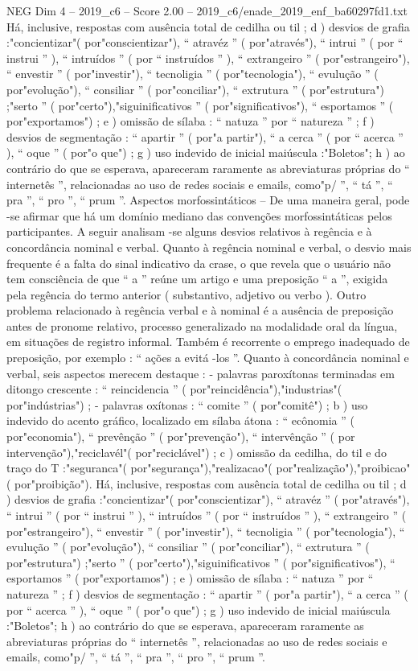 \begin{textsample}{NEG Dim 4 – 2019\_c6 – Score 2.00 – 2019\_c6/enade\_2019\_enf\_ba60297fd1.txt}
Há, inclusive, respostas com ausência total de cedilha ou til ; d ) desvios de grafia :"concientizar"( por"conscientizar"), “ atravéz ” ( por"através"), “ intrui ” ( por “ instrui ” ), “ intruídos ” ( por “ instruídos ” ), “ extrangeiro ” ( por"estrangeiro"), “ envestir ” ( por"investir"), “ tecnoligia ” ( por"tecnologia"), “ evulução ” ( por"evolução"), “ consiliar ” ( por"conciliar"), “ extrutura ” ( por"estrutura") ;"serto ” ( por"certo"),"siguinificativos ” ( por"significativos"), “ esportamos ” ( por"exportamos") ; e ) omissão de sílaba : “ natuza ” por “ natureza ” ; f ) desvios de segmentação : “ apartir ” ( por"a partir"), “ a cerca ” ( por “ acerca ” ), “ oque ” ( por"o que") ; g ) uso indevido de inicial maiúscula :"Boletos"; h ) ao contrário do que se esperava, apareceram raramente as abreviaturas próprias do “ internetês ”, relacionadas ao uso de redes sociais e emails, como"p/ ”, “ tá ”, “ pra ”, “ pro ”, “ prum ”.
Aspectos morfossintáticos – De uma maneira geral, pode -se afirmar que há um domínio mediano das convenções morfossintáticas pelos participantes.
A seguir analisam -se alguns desvios relativos à regência e à concordância nominal e verbal.
Quanto à regência nominal e verbal, o desvio mais frequente é a falta do sinal indicativo da crase, o que revela que o usuário não tem consciência de que “ a ” reúne um artigo e uma preposição “ a ”, exigida pela regência do termo anterior ( substantivo, adjetivo ou verbo ).
Outro problema relacionado à regência verbal e à nominal é a ausência de preposição antes de pronome relativo, processo generalizado na modalidade oral da língua, em situações de registro informal.
Também é recorrente o emprego inadequado de preposição, por exemplo : “ ações a evitá -los ”.
Quanto à concordância nominal e verbal, seis aspectos merecem destaque : - palavras paroxítonas terminadas em ditongo crescente : “ reincidencia ” ( por"reincidência"),"industrias"( por"indústrias") ; - palavras oxítonas : “ comite ” ( por"comitê") ; b ) uso indevido do acento gráfico, localizado em sílaba átona : “ ecônomia ” ( por"economia"), “ prevênção ” ( por"prevenção"), “ intervênção ” ( por intervenção"),"reciclavél"( por"reciclável") ; c ) omissão da cedilha, do til e do traço do T :"seguranca"( por"segurança"),"realizacao"( por"realização"),"proibicao"( por"proibição").
Há, inclusive, respostas com ausência total de cedilha ou til ; d ) desvios de grafia :"concientizar"( por"conscientizar"), “ atravéz ” ( por"através"), “ intrui ” ( por “ instrui ” ), “ intruídos ” ( por “ instruídos ” ), “ extrangeiro ” ( por"estrangeiro"), “ envestir ” ( por"investir"), “ tecnoligia ” ( por"tecnologia"), “ evulução ” ( por"evolução"), “ consiliar ” ( por"conciliar"), “ extrutura ” ( por"estrutura") ;"serto ” ( por"certo"),"siguinificativos ” ( por"significativos"), “ esportamos ” ( por"exportamos") ; e ) omissão de sílaba : “ natuza ” por “ natureza ” ; f ) desvios de segmentação : “ apartir ” ( por"a partir"), “ a cerca ” ( por “ acerca ” ), “ oque ” ( por"o que") ; g ) uso indevido de inicial maiúscula :"Boletos"; h ) ao contrário do que se esperava, apareceram raramente as abreviaturas próprias do “ internetês ”, relacionadas ao uso de redes sociais e emails, como"p/ ”, “ tá ”, “ pra ”, “ pro ”, “ prum ”.

\end{textsample}
